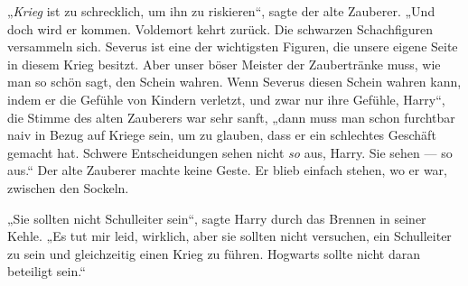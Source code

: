 „\emph{Krieg} ist zu schrecklich, um ihn zu riskieren“, sagte der alte Zauberer.
„Und doch wird er kommen. Voldemort kehrt zurück. Die schwarzen Schachfiguren versammeln sich. Severus ist eine der wichtigsten Figuren, die unsere eigene Seite in diesem Krieg besitzt. Aber unser böser Meister der Zaubertränke muss, wie man so schön sagt, den Schein wahren. Wenn Severus diesen Schein wahren kann, indem er die Gefühle von Kindern verletzt, und zwar nur ihre Gefühle, Harry“, die Stimme des alten Zauberers war sehr sanft, „dann muss man schon furchtbar naiv in Bezug auf Kriege sein, um zu glauben, dass er ein schlechtes Geschäft gemacht hat. Schwere Entscheidungen sehen nicht \emph{so} aus, Harry. Sie sehen — so aus.“ Der alte Zauberer machte keine Geste. Er blieb einfach stehen, wo er war, zwischen den Sockeln.

„Sie sollten nicht Schulleiter sein“, sagte Harry durch das Brennen in seiner Kehle.
„Es tut mir leid, wirklich, aber sie sollten nicht versuchen, ein Schulleiter zu sein und gleichzeitig einen Krieg zu führen. Hogwarts sollte nicht daran beteiligt sein.“

